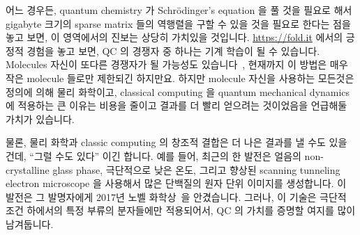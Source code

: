 어느 경우든, quantum chemistry 가 Schr\"{o}dinger's equation 을 풀 것을 필요로
해서 gigabyte 크기의 sparse matrix 들의 역행렬을 구할 수 있을 것을 필요로
한다는 점을 놓고 보면, 이 영역에서의 진보는 상당히 가치있을 것입니다.
\url{https://fold.it} 에서의 긍정적 경험을 놓고 보면, QC 의 경쟁자 중 하나는
기계 학습이 될 수 있습니다.
Molecules 자신이 또다른 경쟁자가 될 가능성도
있습니다~\cite{Chin-wenChou2017ManipulateMolecule}, 현재까지 이 방법은 매우
작은 molecule 들로만 제한되긴 하지만요.
하지만 molecule 자신을 사용하는 모든것은 정의에 의해 물리 화학이고, classical
computing 을 quantum mechanical dynamics 에 적용하는 큰 이유는 비용을 줄이고
결과를 더 빨리 얻으려는 것이었음을 언급해둘 가치가 있습니다.

물론, 물리 화학과 classic computing 의 창조적 결합은 더 나은
결과를 낼 수도 있을 건데, ``그럴 수도 있다'' 이긴 합니다.
예를 들어, 최근의 한 발전은 얼음의 non-crystalline glass phase, 극단적으로 낮은
온도, 그리고 향상된 scanning tunneling electron microscope 을 사용해서 많은
단백질의 원자 단위 이미지를 생성합니다.
이 발전은 그 발명자에게 2017년 노벨
화학상~\cite{NobelPrizeChemistry2017,JohnTimmer2017ChemistryNobel}을
안겼습니다.
그러나, 이 기술은 극단적 조건 하에서의 특정 부류의 분자들에만 적용되어서, QC 의
가치를 증명할 여지를 많이 남겨둡니다.

